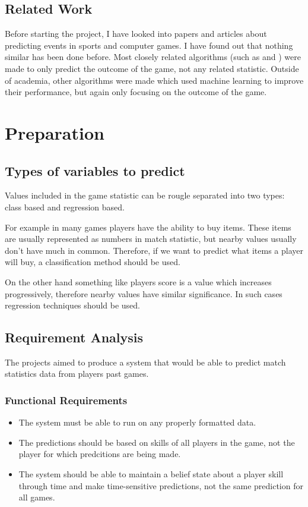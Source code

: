 \documentclass[12pt,a4paper]{book}
\begin{document}
\section{Related Work}
Before starting the project, I have looked into papers and articles about predicting events in sports and computer games.
I have found out that nothing similar has been done before.
Most closely related algorithms (such as \cite{trueskill} and \cite{bayesianranking}) were made to only predict the outcome of the game, not any related statistic.
Outside of academia, other algorithms were made which used machine learning to improve their performance, but again only focusing on the outcome of the game.

\chapter{Preparation}
\section{Types of variables to predict}
Values included in the game statistic can be rougle separated into two types: class based and regression based.

For example in many games players have the ability to buy items.
These items are usually represented as numbers in match statistic, but nearby values usually don't have much in common.
Therefore, if we want to predict what items a player will buy, a classification method should be used.

On the other hand something like players score is a value which increases progressively, therefore nearby values have similar significance.
In such cases regression techniques should be used.
\section{Requirement Analysis}
The projects aimed to produce a system that would be able to predict match statistics data from players past games.
\subsection{Functional Requirements}
\begin{itemize}
\item The system must be able to run on any properly formatted data.
\item The predictions should be based on skills of all players in the game, not the player for which predcitions are being made.
\item The system should be able to maintain a belief state about a player skill through time and make time-sensitive predictions, not the same prediction for all games. %
\end{itemize}
\end{document}
